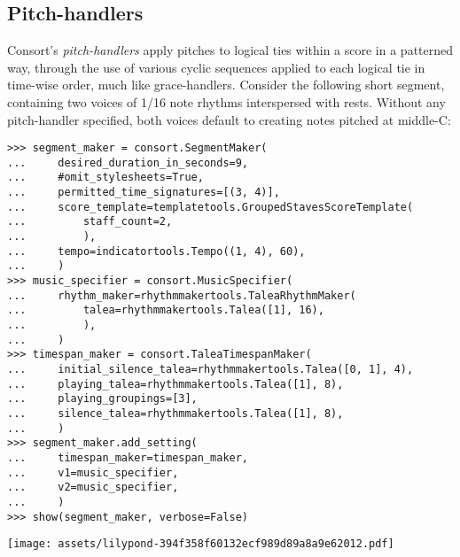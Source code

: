 \subsection{Pitch-handlers}
\label{ssec:pitch-handlers}

Consort's \emph{pitch-handlers} apply pitches to logical ties within a score in
a patterned way, through the use of various cyclic sequences applied to each
logical tie in time-wise order, much like grace-handlers. Consider the
following short segment, containing two voices of 1/16 note rhythms
interspersed with rests. Without any pitch-handler specified, both voices
default to creating notes pitched at middle-C:

\begin{comment}
<abjad>[stylesheet=../consort.ily]
segment_maker = consort.SegmentMaker(
    desired_duration_in_seconds=9,
    #omit_stylesheets=True,
    permitted_time_signatures=[(3, 4)],
    score_template=templatetools.GroupedStavesScoreTemplate(
        staff_count=2,
        ),
    tempo=indicatortools.Tempo((1, 4), 60),
    )
music_specifier = consort.MusicSpecifier(
    rhythm_maker=rhythmmakertools.TaleaRhythmMaker(
        talea=rhythmmakertools.Talea([1], 16),
        ),
    )
timespan_maker = consort.TaleaTimespanMaker(
    initial_silence_talea=rhythmmakertools.Talea([0, 1], 4),
    playing_talea=rhythmmakertools.Talea([1], 8),
    playing_groupings=[3],
    silence_talea=rhythmmakertools.Talea([1], 8),
    )
segment_maker.add_setting(
    timespan_maker=timespan_maker,
    v1=music_specifier,
    v2=music_specifier,
    )
show(segment_maker, verbose=False)
</abjad>
\end{comment}

\begin{abjadbookoutput}
\begin{singlespacing}
\vspace{-0.5\baselineskip}
\begin{lstlisting}
>>> segment_maker = consort.SegmentMaker(
...     desired_duration_in_seconds=9,
...     #omit_stylesheets=True,
...     permitted_time_signatures=[(3, 4)],
...     score_template=templatetools.GroupedStavesScoreTemplate(
...         staff_count=2,
...         ),
...     tempo=indicatortools.Tempo((1, 4), 60),
...     )
>>> music_specifier = consort.MusicSpecifier(
...     rhythm_maker=rhythmmakertools.TaleaRhythmMaker(
...         talea=rhythmmakertools.Talea([1], 16),
...         ),
...     )
>>> timespan_maker = consort.TaleaTimespanMaker(
...     initial_silence_talea=rhythmmakertools.Talea([0, 1], 4),
...     playing_talea=rhythmmakertools.Talea([1], 8),
...     playing_groupings=[3],
...     silence_talea=rhythmmakertools.Talea([1], 8),
...     )
>>> segment_maker.add_setting(
...     timespan_maker=timespan_maker,
...     v1=music_specifier,
...     v2=music_specifier,
...     )
>>> show(segment_maker, verbose=False)
\end{lstlisting}
\noindent\texttt{[image: assets/lilypond-394f358f60132ecf989d89a8a9e62012.pdf]}
\end{singlespacing}
\end{abjadbookoutput}

